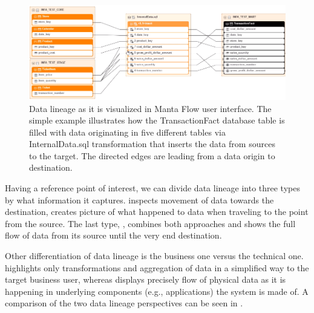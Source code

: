 \begin{figure}[H]
	\centering
	\includegraphics[width=14cm]{../img/DataLineageExample}
	\caption[Data Lineage Visualization]{Data lineage as it is visualized in Manta Flow user interface. The simple example illustrates how the TransactionFact database table is filled with data originating in five different tables via InternalData.sql transformation that inserts the data from sources to the target. The directed edges are leading from a data origin to destination.\cite{MantaExample}}
	\label{LineageGraph}
\end{figure}

Having a reference point of interest, we can divide data lineage into three types by what information it captures.  inspects movement of data towards the destination,  creates picture of what happened to data when traveling to the point from the source. The last type, , combines both approaches and shows the full flow of data from its source until the very end destination.

Other differentiation of data lineage is the business one versus the technical one.
 highlights only transformations and aggregation of data in a simplified way to the target business user, whereas  displays precisely flow of physical data as it is happening in underlying components (e.g., applications) the system is made of. A comparison of the two data lineage perspectives can be seen in .

